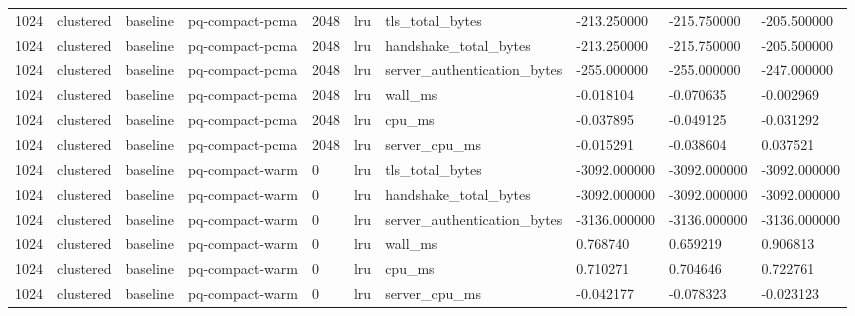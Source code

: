 \begin{tabular}{llllllllll}
1024 & clustered & baseline & pq-compact-pcma & 2048 & lru & tls\_total\_bytes & -213.250000 & -215.750000 & -205.500000 \\
1024 & clustered & baseline & pq-compact-pcma & 2048 & lru & handshake\_total\_bytes & -213.250000 & -215.750000 & -205.500000 \\
1024 & clustered & baseline & pq-compact-pcma & 2048 & lru & server\_authentication\_bytes & -255.000000 & -255.000000 & -247.000000 \\
1024 & clustered & baseline & pq-compact-pcma & 2048 & lru & wall\_ms & -0.018104 & -0.070635 & -0.002969 \\
1024 & clustered & baseline & pq-compact-pcma & 2048 & lru & cpu\_ms & -0.037895 & -0.049125 & -0.031292 \\
1024 & clustered & baseline & pq-compact-pcma & 2048 & lru & server\_cpu\_ms & -0.015291 & -0.038604 & 0.037521 \\
1024 & clustered & baseline & pq-compact-warm & 0 & lru & tls\_total\_bytes & -3092.000000 & -3092.000000 & -3092.000000 \\
1024 & clustered & baseline & pq-compact-warm & 0 & lru & handshake\_total\_bytes & -3092.000000 & -3092.000000 & -3092.000000 \\
1024 & clustered & baseline & pq-compact-warm & 0 & lru & server\_authentication\_bytes & -3136.000000 & -3136.000000 & -3136.000000 \\
1024 & clustered & baseline & pq-compact-warm & 0 & lru & wall\_ms & 0.768740 & 0.659219 & 0.906813 \\
1024 & clustered & baseline & pq-compact-warm & 0 & lru & cpu\_ms & 0.710271 & 0.704646 & 0.722761 \\
1024 & clustered & baseline & pq-compact-warm & 0 & lru & server\_cpu\_ms & -0.042177 & -0.078323 & -0.023123 \\
\end{tabular}
